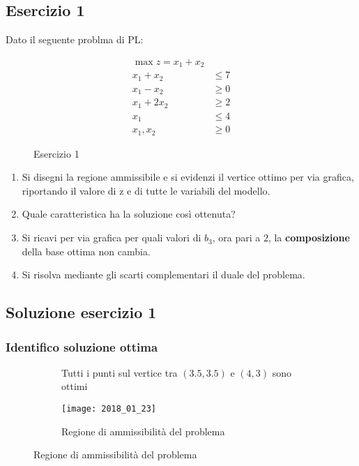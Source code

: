 \documentclass[\main/main.tex]{subfiles}
\begin{document}
\subsection{Esercizio 1}
Dato il seguente problma di PL:

\begin{figure}
	\begin{align*}
		\max z = x_1 + x_2  \\
		x_1 + x_2  & \leq 7 \\
		x_1 - x_2  & \geq 0 \\
		x_1 + 2x_2 & \geq 2 \\
		x_1        & \leq 4 \\
		x_1, x_2   & \geq 0
	\end{align*}
	\caption{Esercizio 1}
\end{figure}

\begin{enumerate}
	\item Si disegni la regione ammissibile e si evidenzi il vertice ottimo per via grafica, riportando il valore di z e di tutte le variabili del modello.
	\item Quale caratteristica ha la soluzione così ottenuta?
	\item Si ricavi per via grafica per quali valori di $b_3$, ora pari a $2$, la \textbf{composizione} della base ottima non cambia.
	\item Si risolva mediante gli scarti complementari il duale del problema.
\end{enumerate}

\subsection{Soluzione esercizio 1}

\subsubsection*{Identifico soluzione ottima}

\begin{figure}
	\begin{subfigure}{0.49\textwidth}
		\caption{Tutti i punti sul vertice tra $(3.5, 3.5)$ e $(4,3)$ sono ottimi}
	\end{subfigure}
	\begin{subfigure}{0.49\textwidth}
		\texttt{[image: 2018\_01\_23]}
		\caption{Regione di ammissibilità del problema}
	\end{subfigure}
\end{figure}
\end{document}
